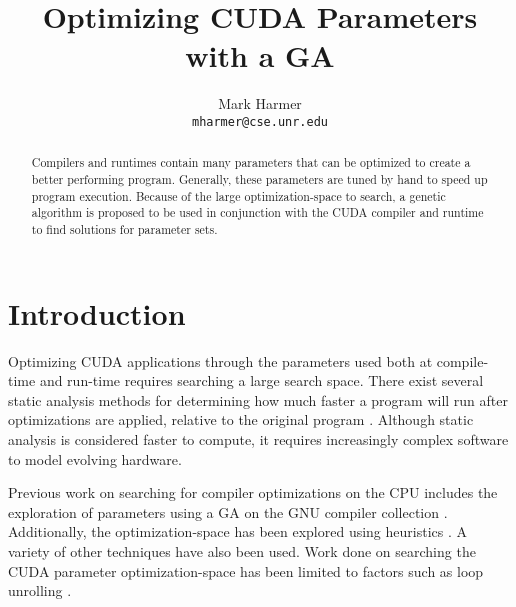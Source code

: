 \documentclass[twocolumn]{IEEEtran}
\begin{document}


\title{Optimizing CUDA Parameters with a GA}

\author{
Mark Harmer\\
\texttt{mharmer@cse.unr.edu}
}

\maketitle

\thispagestyle{empty}
\pagestyle{empty}

\begin{abstract}
Compilers and runtimes contain many parameters that can be optimized to create a better performing program. Generally, these parameters are tuned by hand to speed up program execution. Because of the large optimization-space to search, a genetic algorithm is proposed to be used in conjunction with the CUDA compiler and runtime to find solutions for parameter sets.
\end{abstract}

\section{Introduction}

Optimizing CUDA applications through the parameters used both at compile-time and run-time requires searching a large search space. There exist several static analysis methods for determining how much faster a program will run after optimizations are applied, relative to the original program \cite{Murthy2010}. Although static analysis is considered faster to compute, it requires increasingly complex software to model evolving hardware.

Previous work on searching for compiler optimizations on the CPU includes the exploration of parameters using a GA on the GNU compiler collection \cite{Acovea}. Additionally, the optimization-space has been explored using heuristics \cite{Triantafyllis}. A variety of other techniques have also been used. Work done on searching the CUDA parameter optimization-space has been limited to factors such as loop unrolling \cite{Murthy2010}.
\end{document}
